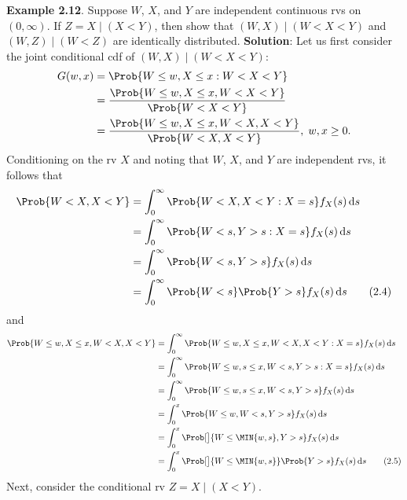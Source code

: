 \begin{Example}
    \textbf{Example 2.12}. Suppose $ W $, $ X $, and $ Y $ are independent continuous rvs on $ (0,\infty) $. If
    $ Z=X\mid(X<Y) $, then show that $ (W,X)\mid(W<X<Y) $ and $ (W,Z)\mid(W<Z) $ are identically distributed.
    \tcblower{}
    \textbf{Solution}: Let us first consider the joint conditional cdf of $ (W,X)\mid(W<X<Y) $:
    \begin{align*}
        G(w,x) & =\Prob{W\le w,X\le x\given W<X<Y}                                   \\
               & =\frac{\Prob{W\le w,X\le x, W<X<Y}}{\Prob{W<X<Y}}                   \\
               & =\frac{\Prob{W\le w,X\le x, W<X, X<Y}}{\Prob{W<X,X<Y}},\; w,x\ge 0.
    \end{align*}
    Conditioning on the rv $ X $ and noting that $ W $, $ X $, and $ Y $ are independent rvs, it follows that
    \begin{align*}
        \Prob{W<X,X<Y}
         & =\int_{0}^{\infty}\Prob{W<X,X<Y\given X=s}f_X(s)\odif{s}                        \\
         & =\int_{0}^{\infty}\Prob{W<s,Y>s\given X=s}f_X(s)\odif{s}                        \\
         & =\int_{0}^{\infty}\Prob{W<s,Y>s}f_X(s)\odif{s}                                  \\
         & =\int_{0}^{\infty}\Prob{W<s}\Prob{Y>s}f_X(s)\odif{s}     \label{eq2.4}\tag{2.4}
    \end{align*}
    and
    \begin{align*}
        \Prob{W\le w,X\le x, W<X, X<Y}
         & =\int_{0}^{\infty}\Prob{W\le w,X\le x,W<X,X<Y\given X=s}f_X(s)\odif{s}                 \\
         & =\int_{0}^{\infty}\Prob{W\le w,s\le x,W<s,Y>s\given X=s}f_X(s)\odif{s}                 \\
         & =\int_{0}^{\infty}\Prob{W\le w,s\le x,W<s,Y>s}f_X(s)\odif{s}                           \\
         & =\int_{0}^{x}\Prob{W\le w,W<s,Y>s}f_X(s)\odif{s}                                       \\
         & =\int_{0}^{x}\Prob[\big]{W\le \MIN{w,s},Y>s}f_X(s)\odif{s}                             \\
         & =\int_{0}^{x}\Prob[\big]{W\le \MIN{w,s}}\Prob{Y>s}f_X(s)\odif{s}\label{eq2.5}\tag{2.5}
    \end{align*}
    Next, consider the conditional rv $ Z=X\mid(X<Y) $.

\end{Example}
